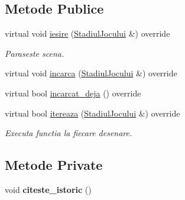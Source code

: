 \subsection*{Metode Publice}
\begin{DoxyCompactItemize}
\item 
\mbox{\label{classMeniuFinal_a1effd96032aadf141533119115dbbe91}} 
virtual void \hyperlink{classMeniuFinal_a1effd96032aadf141533119115dbbe91}{iesire} (\hyperlink{classStadiulJocului}{Stadiul\+Jocului} \&) override
\begin{DoxyCompactList}\small\item\em Paraseste scena. \end{DoxyCompactList}\item 
virtual void \hyperlink{classMeniuFinal_a4a1f2a872c6d0cef0e3f0a8e1545f5de}{incarca} (\hyperlink{classStadiulJocului}{Stadiul\+Jocului} \&) override
\item 
virtual bool \hyperlink{classMeniuFinal_a72edd47d4783b321124d7d7af74b9ef8}{incarcat\+\_\+deja} () override
\item 
virtual bool \hyperlink{classMeniuFinal_a9ee1a22d9df62f0828961d38e05f8aa4}{itereaza} (\hyperlink{classStadiulJocului}{Stadiul\+Jocului} \&) override
\begin{DoxyCompactList}\small\item\em Executa functia la fiecare \textquotesingle{}desenare\textquotesingle{}. \end{DoxyCompactList}\end{DoxyCompactItemize}
\subsection*{Metode Private}
\begin{DoxyCompactItemize}
\item 
\mbox{\label{classMeniuFinal_a663058fca13b16c502d22ac4ee488cf0}} 
void {\bfseries citeste\+\_\+istoric} ()
\end{DoxyCompactItemize}
